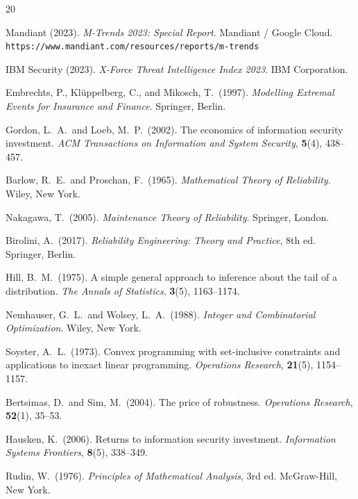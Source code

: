 \documentclass[12pt,a4paper]{article}
\theoremstyle{plain}
\theoremstyle{definition}
\theoremstyle{remark}
\begin{document}
\begin{thebibliography}{20}

Mandiant (2023).
\textit{M-Trends 2023: Special Report}.
Mandiant / Google Cloud.
\texttt{https://www.mandiant.com/resources/reports/m-trends}

IBM Security (2023).
\textit{X-Force Threat Intelligence Index 2023}.
IBM Corporation.

Embrechts, P., Kl\"{u}ppelberg, C., and Mikosch, T.\ (1997).
\textit{Modelling Extremal Events for Insurance and Finance}.
Springer, Berlin.

Gordon, L.\ A.\ and Loeb, M.\ P.\ (2002).
The economics of information security investment.
\textit{ACM Transactions on Information and System Security},
\textbf{5}(4), 438--457.

Barlow, R.\ E.\ and Proschan, F.\ (1965).
\textit{Mathematical Theory of Reliability}.
Wiley, New York.

Nakagawa, T.\ (2005).
\textit{Maintenance Theory of Reliability}.
Springer, London.

Birolini, A.\ (2017).
\textit{Reliability Engineering: Theory and Practice}, 8th ed.
Springer, Berlin.

Hill, B.\ M.\ (1975).
A simple general approach to inference about the tail of a distribution.
\textit{The Annals of Statistics}, \textbf{3}(5), 1163--1174.

Nemhauser, G.\ L.\ and Wolsey, L.\ A.\ (1988).
\textit{Integer and Combinatorial Optimization}.
Wiley, New York.

Soyster, A.\ L.\ (1973).
Convex programming with set-inclusive constraints and applications to
inexact linear programming.
\textit{Operations Research}, \textbf{21}(5), 1154--1157.

Bertsimas, D.\ and Sim, M.\ (2004).
The price of robustness.
\textit{Operations Research}, \textbf{52}(1), 35--53.

Hausken, K.\ (2006).
Returns to information security investment.
\textit{Information Systems Frontiers}, \textbf{8}(5), 338--349.

Rudin, W.\ (1976).
\textit{Principles of Mathematical Analysis}, 3rd ed.
McGraw-Hill, New York.


\end{thebibliography}
\end{document}

